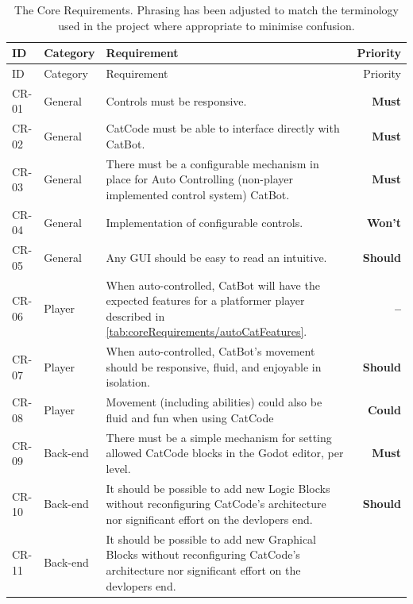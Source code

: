 \begin{center}
  \begin{longtable}{llp{9.5cm}r}
    \caption[Core Requirements]{The Core Requirements. Phrasing has been adjusted to match the terminology used in the project where appropriate to minimise confusion.} \label{tab:coreRequirements/general} \\
    \toprule
    ID
    & Category
    & Requirement
    & Priority \\ \midrule
    \endfirsthead
    \toprule
    ID
    & Category
    & Requirement
    & Priority \\ \midrule
    \endhead
    CR-01
    & General
    & Controls must be responsive.
    & \textbf{Must}
    \\
    CR-02
    & General
    & CatCode must be able to interface directly with CatBot.
    & \textbf{Must}
    \\ 
    CR-03
    & General
    & There must be a configurable mechanism in place for Auto Controlling (non-player implemented control system) CatBot.
    & \textbf{Must}
    \\
    CR-04
    & General
    & Implementation of configurable controls.
    & \textbf{Won't}
    \\ 
    CR-05
    & General
    & Any GUI should be easy to read an intuitive.
    & \textbf{Should}
    \\
    CR-06
    & Player
    & When auto-controlled, CatBot will have the expected features for a platformer player described in \autoref{tab:coreRequirements/autoCatFeatures}.
    & \textbf{--}
    \\
    CR-07
    & Player
    & When auto-controlled, CatBot's movement should be responsive, fluid, and enjoyable in isolation.
    & \textbf{Should}
    \\
    CR-08
    & Player
    & Movement (including abilities) could also be fluid and fun when using CatCode
    & \textbf{Could}
    \\
    CR-09
    & Back-end
    & There must be a simple mechanism for setting allowed CatCode blocks in the Godot editor, per level.
    & \textbf{Must}
    \\
    CR-10
    & Back-end
    & It should be possible to add new Logic Blocks without reconfiguring CatCode's architecture nor significant effort on the devlopers end. 
    & \textbf{Should}
    \\
    CR-11
    & Back-end
    & It should be possible to add new Graphical Blocks without reconfiguring CatCode's architecture nor significant effort on the devlopers end. 

\end{longtable}
\end{center}
